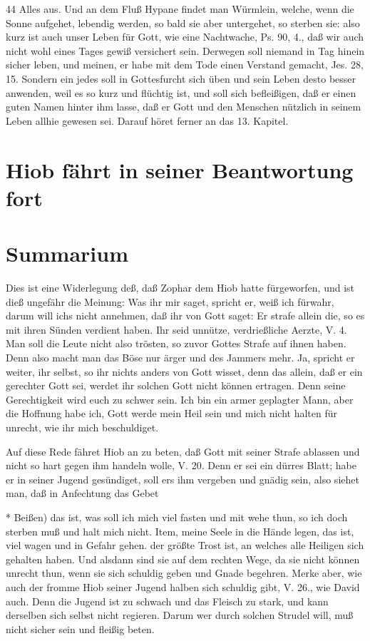 44
Alles aus. Und an dem Fluß Hypane findet man Würmlein, welche, wenn die Sonne aufgehet, lebendig werden, so bald sie aber untergehet, so sterben sie: also kurz ist auch unser Leben für Gott, wie eine Nachtwache, Ps. 90, 4., daß wir auch nicht wohl eines Tages gewiß versichert sein. Derwegen soll niemand in Tag hinein sicher leben, und meinen, er habe mit dem Tode einen Verstand gemacht, Jes. 28, 15. Sondern ein jedes soll in Gottesfurcht sich üben und sein Leben desto besser anwenden, weil es so kurz und flüchtig ist, und soll sich befleißigen, daß er einen guten Namen hinter ihm lasse, daß er Gott und den Menschen nützlich in seinem Leben allhie gewesen sei. Darauf höret ferner an das 13. Kapitel.

\section{Hiob fährt in seiner Beantwortung fort}

\section{Summarium}

Dies ist eine Widerlegung deß, daß Zophar dem Hiob hatte fürgeworfen, und ist dieß ungefähr die Meinung: Was ihr mir saget, spricht er, weiß ich fürwahr, darum will ichs nicht annehmen, daß ihr von Gott saget: Er strafe allein die, so es mit ihren Sünden verdient haben. Ihr seid unnütze, verdrießliche Aerzte, V. 4. Man soll die Leute nicht also trösten, so zuvor Gottes Strafe auf ihnen haben. Denn also macht man das Böse nur ärger und des Jammers mehr. Ja, spricht er weiter, ihr selbst, so ihr nichts anders von Gott wisset, denn das allein, daß er ein gerechter Gott sei, werdet ihr solchen Gott nicht können ertragen. Denn seine Gerechtigkeit wird euch zu schwer sein. Ich bin ein armer geplagter Mann, aber die Hoffnung habe ich, Gott werde mein Heil sein und mich nicht halten für unrecht, wie ihr mich beschuldiget.

Auf diese Rede fähret Hiob an zu beten, daß Gott mit seiner Strafe ablassen und nicht so hart gegen ihm handeln wolle, V. 20. Denn er sei ein dürres Blatt; habe er in seiner Jugend gesündiget, soll ers ihm vergeben und gnädig sein, also siehet man, daß in Anfechtung das Gebet

* Beißen) das ist, was soll ich mich viel fasten und mit wehe thun, so ich doch sterben muß und halt mich nicht. Item, meine Seele in die Hände legen, das ist, viel wagen und in Gefahr gehen.
der größte Trost ist, an welches alle Heiligen sich gehalten haben. Und alsdann sind sie auf dem rechten Wege, da sie nicht können unrecht thun, wenn sie sich schuldig geben und Gnade begehren. Merke aber, wie auch der fromme Hiob seiner Jugend halben sich schuldig gibt, V. 26., wie David auch. Denn die Jugend ist zu schwach und das Fleisch zu stark, und kann derselben sich selbst nicht regieren. Darum wer durch solchen Strudel will, muß nicht sicher sein und fleißig beten.

